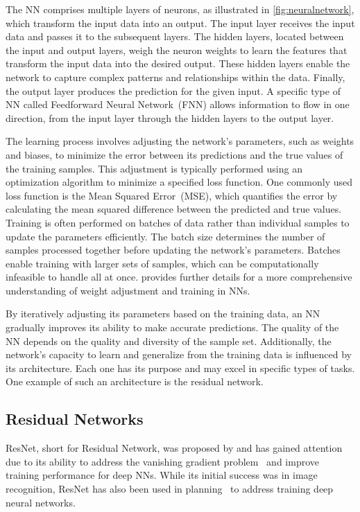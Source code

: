 The NN comprises multiple layers of neurons, as illustrated in \cref{fig:neuralnetwork}, which transform the input data into an output. The input layer receives the input data and passes it to the subsequent layers. The hidden layers, located between the input and output layers, weigh the neuron weights to learn the features that transform the input data into the desired output. These hidden layers enable the network to capture complex patterns and relationships within the data. Finally, the output layer produces the prediction for the given input. A specific type of NN called Feedforward Neural Network~(FNN) allows information to flow in one direction, from the input layer through the hidden layers to the output layer.

The learning process involves adjusting the network's parameters, such as weights and biases, to minimize the error between its predictions and the true values of the training samples. This adjustment is typically performed using an optimization algorithm to minimize a specified loss function. One commonly used loss function is the Mean Squared Error~(MSE), which quantifies the error by calculating the mean squared difference between the predicted and true values. Training is often performed on batches of data rather than individual samples to update the parameters efficiently. The batch size determines the number of samples processed together before updating the network's parameters. Batches enable training with larger sets of samples, which can be computationally infeasible to handle all at once. \citet{haykin2009neural} provides further details for a more comprehensive understanding of weight adjustment and training in NNs.

By iteratively adjusting its parameters based on the training data, an NN gradually improves its ability to make accurate predictions. The quality of the NN depends on the quality and diversity of the sample set. Additionally, the network's capacity to learn and generalize from the training data is influenced by its architecture. Each one has its purpose and may excel in specific types of tasks. One example of such an architecture is the residual network.

\subsection{Residual Networks}
\label{sec:resnets}

ResNet, short for Residual Network, was proposed by \citet{he2016deep} and has gained attention due to its ability to address the vanishing gradient problem~\cite{hochreiter1998vanishing} and improve training performance for deep NNs. While its initial success was in image recognition, ResNet has also been used in planning~\cite{agostinelli2019solving,ferber2022neural} to address training deep neural networks.

